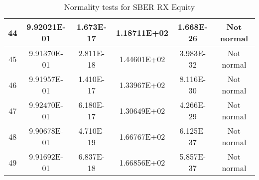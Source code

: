 \begin{table}[h]
\begin{tabular}{|c|c|c|c|c|c|}
		44 & 9.92021E-01 & 1.673E-17 & 1.18711E+02 & 1.668E-26 & Not normal\\\hline
		45 & 9.91370E-01 & 2.811E-18 & 1.44601E+02 & 3.983E-32 & Not normal\\\hline
		46 & 9.91957E-01 & 1.410E-17 & 1.33967E+02 & 8.116E-30 & Not normal\\\hline
		47 & 9.92470E-01 & 6.180E-17 & 1.30649E+02 & 4.266E-29 & Not normal\\\hline
		48 & 9.90678E-01 & 4.710E-19 & 1.66767E+02 & 6.125E-37 & Not normal\\\hline
		49 & 9.91692E-01 & 6.837E-18 & 1.66856E+02 & 5.857E-37 & Not normal\\\hline
	\end{tabular}
	\caption{Normality tests for SBER RX Equity}
	\label{tab:normality_tests_SBER_RX}
\end{table}
